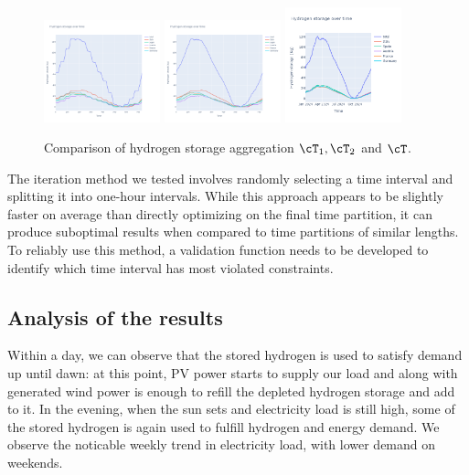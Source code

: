 \documentclass[english]{article}
\numberwithin{definition}{section}
\numberwithin{theorem}{section}
\numberwithin{problem}{section}
\begin{document}
\begin{figure}[H]
  \centering
  \includegraphics[width=0.30\textwidth]{immagini/time_aggregation/agg2hydrogen.png}
  \includegraphics[width=0.30\textwidth]{immagini/time_aggregation/agg1hydrogen.png}
  \includegraphics[width=0.30\textwidth]{immagini/time_aggregation/finesthydrongen.png}
  \caption{Comparison of hydrogen storage aggregation \(\cT_1,\cT_2\) and \(\cT\).}
  \label{fig:aggHydrogen}
\end{figure}

The iteration method we tested involves randomly selecting a time interval and splitting it into one-hour
intervals. While this approach appears to be slightly faster on average than directly optimizing on the final
time partition, it can produce suboptimal results when compared to time partitions of similar lengths.
To reliably use this method, a validation function needs to be developed to identify which time interval has most violated constraints.
\subsection{Analysis of the results}

Within a day, we can observe that the stored hydrogen is used to satisfy demand up until dawn: at this point, PV power starts to supply our load and along with generated wind power is enough to refill the depleted hydrogen storage and add to it. In the evening, when the sun sets and electricity load is still high, some of the stored hydrogen is again used to fulfill hydrogen and energy demand. We observe the noticable weekly trend in electricity load, with lower demand on weekends. 
\end{document}
